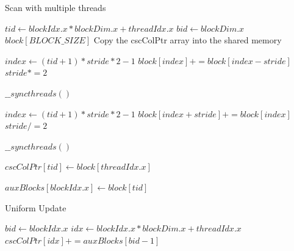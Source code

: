 \documentclass{IEEEconf}
\begin{document}
\begin{algorithm}
    \caption{Scan with multiple threads}
    \begin{algorithmic}
            \State $tid \gets blockIdx.x * blockDim.x + threadIdx.x$
            \State $bid \gets blockDim.x$
            \State $block[BLOCK\_SIZE]$
            \Comment Copy the cscColPtr array into the shared memory
            
                \State $index \gets (tid+1) * stride * 2 - 1$
                    \State $block[index] += block[index - stride]$
                \EndIf
                \State $stride *=2$
            \EndFor

            \State $\_\_syncthreads()$

                \State $index \gets (tid+1) * stride * 2 - 1$
                    \State $block[index + stride] += block[index]$
                \EndIf
                \State $stride /= 2$
            \EndFor

            \State $\_\_syncthreads()$

                \State $cscColPtr[tid] \gets block[threadIdx.x]$
            \EndIf

                \State $auxBlocks[blockIdx.x] \gets block[tid]$
            \EndIf
        \EndProcedure
    \end{algorithmic}
    \label{alg:scan_v2}
\end{algorithm}
\begin{algorithm}
    \caption{Uniform Update}
    \begin{algorithmic}
        \State $bid \gets blockIdx.x$
        \State $idx \gets blockIdx.x * blockDim.x + threadIdx.x$
            \State $cscColPtr[idx] += auxBlocks[bid - 1]$
        \EndIf
        \EndProcedure
    \end{algorithmic}
    \label{alg:uniform_update}
\end{algorithm}
\end{document}
